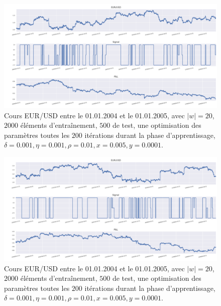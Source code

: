 \documentclass[a4paper, 11pt]{article}
\begin{document}
 \begin{figure}
	\centering
	\includegraphics[scale=0.5]{res/eursud_2004-2005_from_20000to_30000}
	\caption[Blup]{Cours EUR/USD entre le 01.01.2004 et le 01.01.2005, avec $|w| = 20$, $2000$ éléments d'entraînement, $500$ de test, une optimisation des
		paramètres toutes les $200$ itérations durant la phase d'apprentissage, $\delta = 0.001, \eta=0.001,\rho=0.01, x = 0.005, y=0.0001$.}
\end{figure}

 \begin{figure}
	\centering
	\includegraphics[scale=0.5]{res/eursud_2004-2005_from_30000to_40000}
	\caption[Blup]{Cours EUR/USD entre le 01.01.2004 et le 01.01.2005, avec $|w| = 20$, $2000$ éléments d'entraînement, $500$ de test, une optimisation des
		paramètres toutes les $200$ itérations durant la phase d'apprentissage, $\delta = 0.001, \eta=0.001,\rho=0.01, x = 0.005, y=0.0001$.}
\end{figure}
\end{document}
